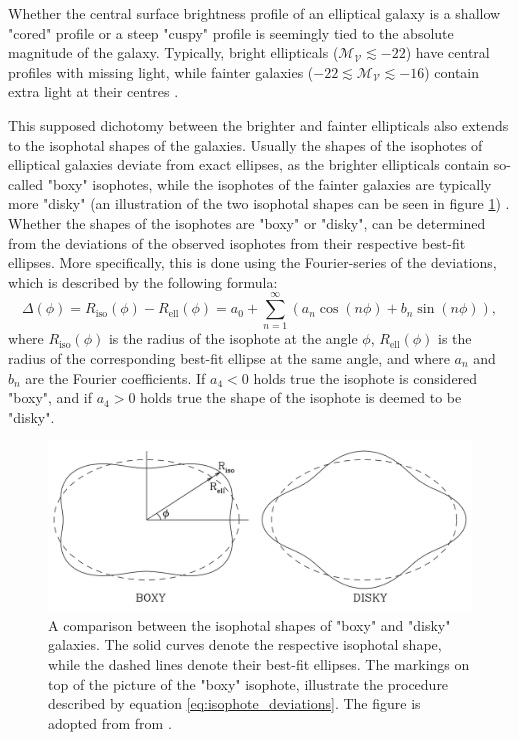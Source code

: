 \documentclass[english, twoside]{HYgradu}
\begin{document}
Whether the central surface brightness profile of an elliptical galaxy is a shallow "cored" profile or a steep "cuspy" profile is seemingly tied to the absolute magnitude of the galaxy. Typically, bright ellipticals ($\mathcal{M_V} \lesssim -22$) have central profiles with missing light, while fainter galaxies ($-22 \lesssim \mathcal{M_V} \lesssim -16$) contain extra light at their centres \citep{Kormendy2009}. 

This supposed dichotomy between the brighter and fainter ellipticals also extends to the isophotal shapes of the galaxies. Usually the shapes of the isophotes of elliptical galaxies deviate from exact ellipses, as the brighter ellipticals contain so-called "boxy" isophotes, while the isophotes of the fainter galaxies are typically more "disky" (an illustration of the two isophotal shapes can be seen in figure \ref{figure:isophotes}) \citep{GalaxyFormationAndEvo2010}. Whether the shapes of the isophotes are "boxy" or "disky", can be determined from the deviations of the observed isophotes from their respective best-fit ellipses. More specifically, this is done using the Fourier-series of the deviations, which is described by the following formula:
\begin{equation}
\Delta (\phi) = R_\mathrm{iso}(\phi) - R_\mathrm{ell}(\phi) = a_0 + \displaystyle\sum^\infty_{n=1} (a_n \cos(n\phi) + b_n \sin(n\phi)), \label{eq:isophote_deviations}
\end{equation}
where $R_\mathrm{iso}(\phi)$ is the radius of the isophote at the angle $\phi$, $R_\mathrm{ell}(\phi)$ is the radius of the corresponding best-fit ellipse at the same angle, and where $a_n$ and $b_n$ are the Fourier coefficients. If $a_4 < 0$ holds true the isophote is considered "boxy", and if $a_4 > 0$ holds true the shape of the isophote is deemed to be "disky".

\begin{figure}
	\centering
	\includegraphics[width=\textwidth]{boxy_and_disky_GFE.png}
	\caption{A comparison between the isophotal shapes of "boxy" and "disky" galaxies. The solid curves denote the respective isophotal shape, while the dashed lines denote their best-fit ellipses. The markings on top of the picture of the "boxy" isophote, illustrate the procedure described by equation \ref{eq:isophote_deviations}. The figure is adopted from from \cite{GalaxyFormationAndEvo2010}.}
	\label{figure:isophotes}
\end{figure}
\end{document}
